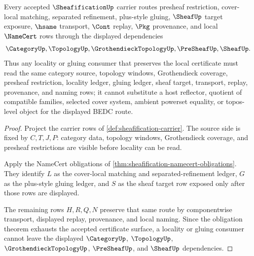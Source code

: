 \begin{theorem}
\label{thm:sheafification-locality-gluing-scope}
Every accepted $\SheafificationUp$ carrier routes presheaf restriction, cover-local matching, separated refinement, plus-style gluing, $\SheafUp$ target exposure, $\hsame$ transport, $\Cont$ replay, $\Pkg$ provenance, and local $\NameCert$ rows through the displayed dependencies
$$
\CategoryUp,\TopologyUp,\GrothendieckTopologyUp,\PreSheafUp,\SheafUp .
$$
Thus any locality or gluing consumer that preserves the local certificate must read the same category source, topology windows, Grothendieck coverage, presheaf restriction, locality ledger, gluing ledger, sheaf target, transport, replay, provenance, and naming rows; it cannot substitute a host reflector, quotient of compatible families, selected cover system, ambient powerset equality, or topos-level object for the displayed BEDC route.
\end{theorem}
\begin{proof}
Project the carrier rows of \autoref{def:sheafification-carrier}. The source side is fixed by $C,T,J,P$: category data, topology windows, Grothendieck coverage, and presheaf restrictions are visible before locality can be read.

Apply the NameCert obligations of \autoref{thm:sheafification-namecert-obligations}. They identify $L$ as the cover-local matching and separated-refinement ledger, $G$ as the plus-style gluing ledger, and $S$ as the sheaf target row exposed only after those rows are displayed.

The remaining rows $H,R,Q,N$ preserve that same route by componentwise transport, displayed replay, provenance, and local naming. Since the obligation theorem exhausts the accepted certificate surface, a locality or gluing consumer cannot leave the displayed $\CategoryUp$, $\TopologyUp$, $\GrothendieckTopologyUp$, $\PreSheafUp$, and $\SheafUp$ dependencies.
\end{proof}

